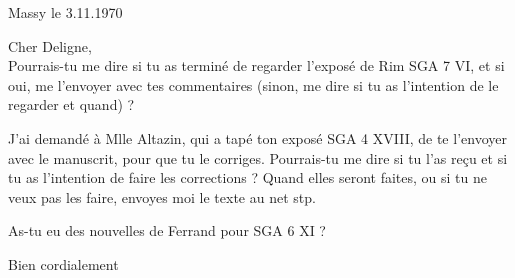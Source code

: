 \begin{flushright}
Massy le 3.11.1970\\
\end{flushright}
Cher Deligne,\\

Pourrais-tu me dire si tu as terminé de regarder l'exposé de Rim SGA 7 VI, et si oui, me l'envoyer avec tes commentaires (sinon, me dire si tu as l'intention de le regarder et quand) ?

J'ai demandé à Mlle Altazin, qui a tapé ton exposé SGA 4 XVIII, de te l'envoyer avec le manuscrit, pour que tu le corriges. Pourrais-tu me dire si tu l'as reçu et si tu as l'intention de faire les corrections ? Quand elles seront faites, ou si tu ne veux pas les faire, envoyes moi le texte au net stp.

As-tu eu des nouvelles de Ferrand pour SGA 6 XI ?

Bien cordialement\\
